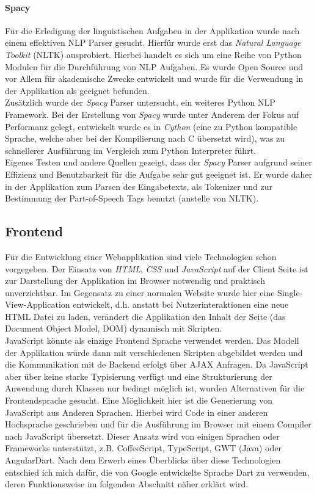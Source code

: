\paragraph{Spacy}
\label{sec:spacy}
Für die Erledigung der linguistischen Aufgaben in der Applikation wurde nach einem effektiven NLP Parser gesucht. Hierfür wurde erst das \textit{Natural Language Toolkit} (NLTK)\cite{Bird2004a} ausprobiert. Hierbei handelt es sich um eine Reihe von Python Modulen für die Durchführung von NLP Aufgaben. Es wurde Open Source und vor Allem für akademische Zwecke entwickelt und wurde für die Verwendung in der Applikation als geeignet befunden.\\
Zusätzlich wurde der \textit{Spacy} Parser untersucht, ein weiteres Python NLP Framework. Bei der Erstellung von \textit{Spacy} wurde unter Anderem der Fokus auf Performanz gelegt, entwickelt wurde es in \textit{Cython} (eine zu Python kompatible Sprache, welche aber bei der Kompilierung nach C übersetzt wird), was zu schnellerer Ausführung im Vergleich zum Python Interpreter führt.\\
Eigenes Testen und andere Quellen gezeigt, dass der \textit{Spacy} Parser aufgrund seiner Effizienz\cite{Stent2015} und Benutzbarkeit für die Aufgabe sehr gut geeignet ist. Er wurde daher in der Applikation zum Parsen des Eingabetexts, als Tokenizer und zur Bestimmung der Part-of-Speech Tags benutzt (anstelle von NLTK).

\subsection{Frontend}

Für die Entwicklung einer Webapplikation sind viele Technologien schon vorgegeben. Der Einsatz von \textit{HTML}, \textit{CSS} und \textit{JavaScript} auf der Client Seite ist zur Darstellung der Applikation im Browser notwendig und praktisch unverzichtbar. Im Gegensatz zu einer normalen Website wurde hier eine Single-View-Application entwickelt, d.h. anstatt bei Nutzerinteraktionen eine neue HTML Datei zu laden, verändert die Applikation den Inhalt der Seite (das Document Object Model, DOM) dynamisch mit Skripten\cite{mikowski2013single}.\\

JavaScript könnte als einzige Frontend Sprache verwendet werden. Das Modell der Applikation würde dann mit verschiedenen Skripten abgebildet werden und die Kommunikation mit de Backend erfolgt über AJAX Anfragen. Da JavaScript aber über keine starke Typisierung verfügt und eine Strukturierung der Anwendung durch Klassen nur bedingt möglich ist, wurden Alternativen für die Frontendsprache gesucht. Eine Möglichkeit hier ist die Generierung von JavaScript aus Anderen Sprachen. Hierbei wird Code in einer anderen Hochsprache geschrieben und für die Ausführung im Browser mit einem Compiler nach JavaScript übersetzt. Dieser Ansatz wird von einigen Sprachen oder Frameworks unterstützt, z.B. CoffeeScript, TypeScript, GWT (Java) oder AngularDart. Nach dem Erwerb eines Überblicks über diese Technologien entschied ich mich dafür, die von Google entwickelte Sprache Dart zu verwenden, deren Funktionsweise im folgenden Abschnitt näher erklärt wird.

